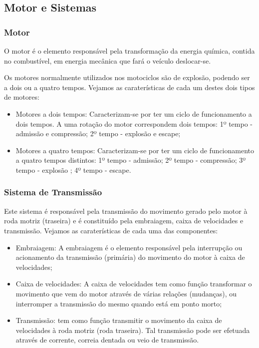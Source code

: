 \documentclass{report}
\begin{document}
\subsection{Motor e Sistemas}
\subsubsection{Motor}
O motor é o elemento responsável pela transformação da energia química, contida no combustível, em energia mecânica que fará o veículo deslocar-se.

Os motores normalmente utilizados nos motociclos são de explosão, podendo ser a dois ou a quatro tempos.
Vejamos as caraterísticas de cada um destes dois tipos de motores:
\begin{itemize}
\item Motores a dois tempos: Caracterizam-se por ter um ciclo de funcionamento a dois tempos. A uma rotação do motor correspondem dois tempos: 1º tempo - admissão e compressão; 2º tempo - explosão e escape;
\item Motores a quatro tempos: Caracterizam-se por ter um ciclo de funcionamento a quatro tempos distintos: 1º tempo - admissão; 2º tempo - compressão; 3º tempo - explosão ; 4º tempo - escape.
\end{itemize}
\subsubsection{Sistema de Transmissão}
Este sistema é responsável pela transmissão do movimento gerado pelo motor à roda motriz (traseira) e é constituído pela embraiagem, caixa de velocidades e transmissão.
Vejamos as caraterísticas de cada uma das componentes:
\begin{itemize}
\item Embraiagem: A embraiagem é o elemento responsável pela interrupção ou acionamento da transmissão (primária) do movimento do motor à caixa de velocidades;
\item Caixa de velocidades: A caixa de velocidades tem como função transformar o movimento que vem do motor através de várias relações (mudanças), ou interromper a transmissão do mesmo quando está em ponto morto; 
\item Transmissão: tem como função transmitir o movimento da caixa de velocidades à roda motriz (roda traseira). Tal transmissão pode ser efetuada através de corrente, correia dentada ou veio de transmissão.
\end{itemize} 
\end{document}
